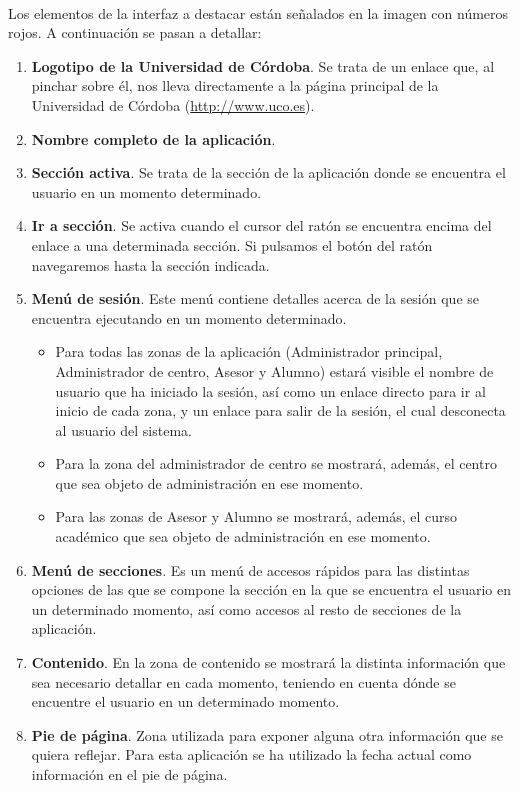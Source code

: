   \paragraph{}Los elementos de la interfaz a destacar están señalados en la
  imagen con números rojos. A continuación se pasan a detallar:

  \begin{enumerate}
    \item \textbf{Logotipo de la Universidad de Córdoba}. Se trata de un
    enlace que, al pinchar sobre él, nos lleva directamente a la página
    principal de la Universidad de Córdoba (\url{http://www.uco.es}).
    \item \textbf{Nombre completo de la aplicación}.
    \item \textbf{Sección activa}. Se trata de la sección de la aplicación donde
    se encuentra el usuario en un momento determinado.
    \item \textbf{Ir a sección}. Se activa cuando el cursor del ratón se
    encuentra encima del enlace a una determinada sección. Si pulsamos el botón
    del ratón navegaremos hasta la sección indicada.
    \item \textbf{Menú de sesión}. Este menú contiene detalles acerca de la
    sesión que se encuentra ejecutando en un momento determinado.
    \begin{itemize}
      \item Para todas las zonas de la aplicación (Administrador principal,
      Administrador de centro, Asesor y Alumno) estará visible el nombre de
      usuario que ha iniciado la sesión, así como un enlace directo para ir al
      inicio de cada zona, y un enlace para salir de la sesión, el cual
      desconecta al usuario del sistema.
      \item Para la zona del administrador de centro se mostrará, además,
      el centro que sea objeto de administración en ese momento.
      \item Para las zonas de Asesor y Alumno se mostrará, además, el curso
      académico que sea objeto de administración en ese momento.
    \end{itemize}

    \item \textbf{Menú de secciones}. Es un menú de accesos rápidos para las
    distintas opciones de las que se compone la sección en la que se encuentra
    el usuario en un determinado momento, así como accesos al resto de
    secciones de la aplicación.
    \item \textbf{Contenido}. En la zona de contenido se mostrará la distinta
    información que sea necesario detallar en cada momento, teniendo en cuenta
    dónde se encuentre el usuario en un determinado momento.
    \item \textbf{Pie de página}. Zona utilizada para exponer alguna otra
    información que se quiera reflejar. Para esta aplicación se ha utilizado
    la fecha actual como información en el pie de página.
  \end{enumerate}

  
